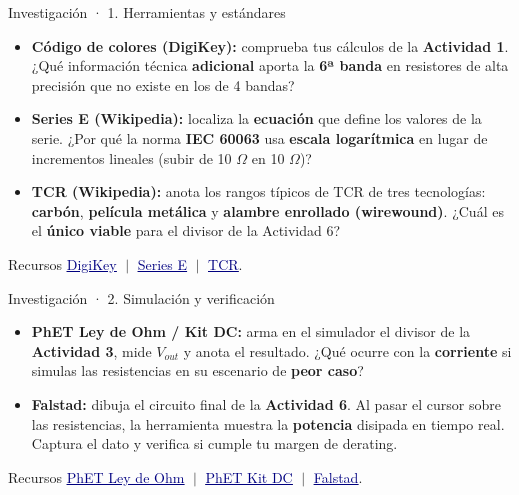 \documentclass[aspectratio=169]{beamer}
\newcommand{\enlace}[2]{\href{#1}{\textcolor{navy}{\underline{#2}}}}
\begin{document}
\begin{frame}{Investigación · 1. Herramientas y estándares}
  \begin{itemize}
    \item \textbf{Código de colores (DigiKey):} comprueba tus cálculos de la
      \textbf{Actividad 1}. ¿Qué información técnica \textbf{adicional} aporta la
      \textbf{6ª banda} en resistores de alta precisión que no existe en los de 4 bandas?
    \item \textbf{Series E (Wikipedia):} localiza la \textbf{ecuación} que define los
      valores de la serie. ¿Por qué la norma \textbf{IEC 60063} usa \textbf{escala
      logarítmica} en lugar de incrementos lineales (subir de 10 $\Omega$ en 10 $\Omega$)?
    \item \textbf{TCR (Wikipedia):} anota los rangos típicos de TCR de tres tecnologías:
      \textbf{carbón}, \textbf{película metálica} y \textbf{alambre enrollado (wirewound)}.
      ¿Cuál es el \textbf{único viable} para el divisor de la Actividad 6?
  \end{itemize}
  \pause
  \begin{block}{Recursos}
    \small
    \enlace{https://www.digikey.com/en/resources/conversion-calculators/conversion-calculator-resistor-color-code}{DigiKey}
    $\;|\;$ \enlace{https://en.wikipedia.org/wiki/E_series_of_preferred_numbers}{Series E}
    $\;|\;$ \enlace{https://en.wikipedia.org/wiki/Temperature_coefficient}{TCR}.
  \end{block}
\end{frame}

\begin{frame}{Investigación · 2. Simulación y verificación}
  \begin{itemize}
    \item \textbf{PhET Ley de Ohm / Kit DC:} arma en el simulador el divisor de la
      \textbf{Actividad 3}, mide $V_{out}$ y anota el resultado. ¿Qué ocurre con la
      \textbf{corriente} si simulas las resistencias en su escenario de \textbf{peor caso}?
    \item \textbf{Falstad:} dibuja el circuito final de la \textbf{Actividad 6}. Al pasar
      el cursor sobre las resistencias, la herramienta muestra la \textbf{potencia}
      disipada en tiempo real. Captura el dato y verifica si cumple tu margen de derating.
  \end{itemize}
  \pause
  \begin{block}{Recursos}
    \small
    \enlace{https://phet.colorado.edu/sims/html/ohms-law/latest/ohms-law_en.html}{PhET Ley de Ohm}
    $\;|\;$ \enlace{https://phet.colorado.edu/sims/html/circuit-construction-kit-dc/latest/circuit-construction-kit-dc_en.html}{PhET Kit DC}
    $\;|\;$ \enlace{https://www.falstad.com/circuit/}{Falstad}.
  \end{block}
\end{frame}
\end{document}
